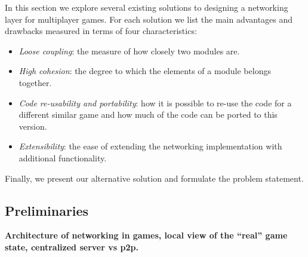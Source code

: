 In this section we explore several existing solutions to designing a networking layer for multiplayer games. For each solution we list the main advantages and drawbacks measured in terms of four characteristics:

\begin{itemize}[noitemsep]
	\item \textit{Loose coupling}: the measure of how closely two modules are.
	\item \textit{High cohesion}: the degree to which the elements of a module belongs together.
	\item \textit{Code re-usability and portability}: how it is possible to re-use the code for a different similar game and how much of the code can be ported to this version.
	\item \textit{Extensibility}: the ease of extending the networking implementation with additional functionality.
\end{itemize}

\noindent
Finally, we present our alternative solution and formulate the problem statement.

\subsection{Preliminaries}
\label{sec:preliminaries}
\textbf{Architecture of networking in games, local view of the ``real'' game state, centralized server vs p2p.
}
